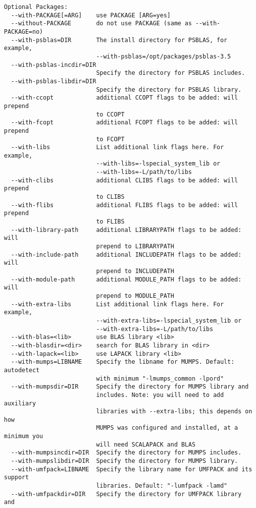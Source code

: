 \begin{verbatim}
Optional Packages:
  --with-PACKAGE[=ARG]    use PACKAGE [ARG=yes]
  --without-PACKAGE       do not use PACKAGE (same as --with-PACKAGE=no)
  --with-psblas=DIR       The install directory for PSBLAS, for example,
                          --with-psblas=/opt/packages/psblas-3.5
  --with-psblas-incdir=DIR
                          Specify the directory for PSBLAS includes.
  --with-psblas-libdir=DIR
                          Specify the directory for PSBLAS library.
  --with-ccopt            additional CCOPT flags to be added: will prepend
                          to CCOPT
  --with-fcopt            additional FCOPT flags to be added: will prepend
                          to FCOPT
  --with-libs             List additional link flags here. For example,
                          --with-libs=-lspecial_system_lib or
                          --with-libs=-L/path/to/libs
  --with-clibs            additional CLIBS flags to be added: will prepend
                          to CLIBS
  --with-flibs            additional FLIBS flags to be added: will prepend
                          to FLIBS
  --with-library-path     additional LIBRARYPATH flags to be added: will
                          prepend to LIBRARYPATH
  --with-include-path     additional INCLUDEPATH flags to be added: will
                          prepend to INCLUDEPATH
  --with-module-path      additional MODULE_PATH flags to be added: will
                          prepend to MODULE_PATH
  --with-extra-libs       List additional link flags here. For example,
                          --with-extra-libs=-lspecial_system_lib or
                          --with-extra-libs=-L/path/to/libs
  --with-blas=<lib>       use BLAS library <lib>
  --with-blasdir=<dir>    search for BLAS library in <dir>
  --with-lapack=<lib>     use LAPACK library <lib>
  --with-mumps=LIBNAME    Specify the libname for MUMPS. Default: autodetect
                          with minimum "-lmumps_common -lpord"
  --with-mumpsdir=DIR     Specify the directory for MUMPS library and
                          includes. Note: you will need to add auxiliary
                          libraries with --extra-libs; this depends on how
                          MUMPS was configured and installed, at a minimum you
                          will need SCALAPACK and BLAS
  --with-mumpsincdir=DIR  Specify the directory for MUMPS includes.
  --with-mumpslibdir=DIR  Specify the directory for MUMPS library.
  --with-umfpack=LIBNAME  Specify the library name for UMFPACK and its support
                          libraries. Default: "-lumfpack -lamd"
  --with-umfpackdir=DIR   Specify the directory for UMFPACK library and

\end{verbatim}
